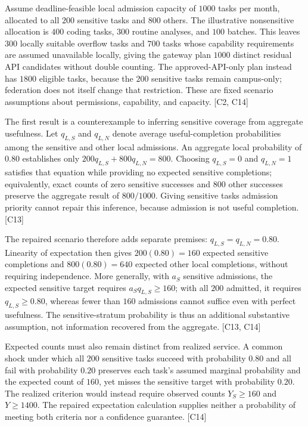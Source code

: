 \documentclass[11pt]{article}
\begin{document}
Assume deadline-feasible local admission capacity of $1000$ tasks per month, allocated to all $200$ sensitive tasks and $800$ others. The illustrative nonsensitive allocation is $400$ coding tasks, $300$ routine analyses, and $100$ batches. This leaves $300$ locally suitable overflow tasks and $700$ tasks whose capability requirements are assumed unavailable locally, giving the gateway plan $1000$ distinct residual API candidates without double counting. The approved-API-only plan instead has $1800$ eligible tasks, because the $200$ sensitive tasks remain campus-only; federation does not itself change that restriction. These are fixed scenario assumptions about permissions, capability, and capacity. [C2, C14]

The first result is a counterexample to inferring sensitive coverage from aggregate usefulness. Let $q_{L,S}$ and $q_{L,N}$ denote average useful-completion probabilities among the sensitive and other local admissions. An aggregate local probability of $0.80$ establishes only $200q_{L,S}+800q_{L,N}=800$. Choosing $q_{L,S}=0$ and $q_{L,N}=1$ satisfies that equation while providing no expected sensitive completions; equivalently, exact counts of zero sensitive successes and $800$ other successes preserve the aggregate result of $800/1000$. Giving sensitive tasks admission priority cannot repair this inference, because admission is not useful completion. [C13]

The repaired scenario therefore adds separate premises: $q_{L,S}=q_{L,N}=0.80$. Linearity of expectation then gives $200(0.80)=160$ expected sensitive completions and $800(0.80)=640$ expected other local completions, without requiring independence. More generally, with $a_S$ sensitive admissions, the expected sensitive target requires $a_Sq_{L,S}\geq160$; with all $200$ admitted, it requires $q_{L,S}\geq0.80$, whereas fewer than $160$ admissions cannot suffice even with perfect usefulness. The sensitive-stratum probability is thus an additional substantive assumption, not information recovered from the aggregate. [C13, C14]

Expected counts must also remain distinct from realized service. A common shock under which all $200$ sensitive tasks succeed with probability $0.80$ and all fail with probability $0.20$ preserves each task's assumed marginal probability and the expected count of $160$, yet misses the sensitive target with probability $0.20$. The realized criterion would instead require observed counts $Y_S\geq160$ and $Y\geq1400$. The repaired expectation calculation supplies neither a probability of meeting both criteria nor a confidence guarantee. [C14]
\end{document}
